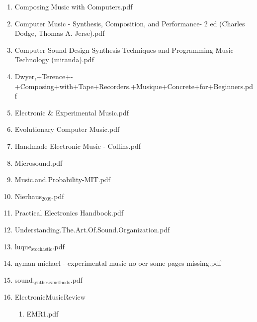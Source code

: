 \documentclass[11pt]{article}
\begin{document}
\begin{enumerate}
\begin{enumerate}
\item Composing Music with Computers.pdf
\label{sec-1-1-1-1-11-19-20-3}

\item Computer Music - Synthesis, Composition, and Performance- 2 ed (Charles Dodge, Thomas A. Jerse).pdf
\label{sec-1-1-1-1-11-19-20-4}

\item Computer-Sound-Design-Synthesis-Techniques-and-Programming-Music-Technology (miranda).pdf
\label{sec-1-1-1-1-11-19-20-5}

\item Dwyer,+Terence+-+Composing+with+Tape+Recorders.+Musique+Concrete+for+Beginners.pdf
\label{sec-1-1-1-1-11-19-20-6}

\item Electronic \& Experimental Music.pdf
\label{sec-1-1-1-1-11-19-20-7}

\item Evolutionary Computer Music.pdf
\label{sec-1-1-1-1-11-19-20-8}

\item Handmade Electronic Music - Collins.pdf
\label{sec-1-1-1-1-11-19-20-9}

\item Microsound.pdf
\label{sec-1-1-1-1-11-19-20-10}

\item Music.and.Probability-ΜΙΤ.pdf
\label{sec-1-1-1-1-11-19-20-11}

\item Nierhaus$_{\text{2009}}$.pdf
\label{sec-1-1-1-1-11-19-20-12}

\item Practical Electronics Handbook.pdf
\label{sec-1-1-1-1-11-19-20-13}

\item Understanding.The.Art.Of.Sound.Organization.pdf
\label{sec-1-1-1-1-11-19-20-14}

\item luque$_{\text{stochastic}}$.pdf
\label{sec-1-1-1-1-11-19-20-15}

\item nyman michael - experimental music no ocr some pages missing.pdf
\label{sec-1-1-1-1-11-19-20-16}

\item sound$_{\text{synthesis}}$$_{\text{methods}}$.pdf
\label{sec-1-1-1-1-11-19-20-17}

\item ElectronicMusicReview
\label{sec-1-1-1-1-11-19-20-18}
\begin{enumerate}
\item EMR1.pdf
\label{sec-1-1-1-1-11-19-20-18-1}


\end{enumerate}
\end{enumerate}
\end{enumerate}
\end{document}
